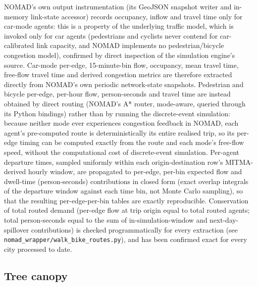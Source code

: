 \documentclass[pdflatex,sn-mathphys-ay]{sn-jnl}
\begin{document}
NOMAD's own output instrumentation (its GeoJSON snapshot writer and
in-memory link-state accessor) records occupancy, inflow and travel time only
for car-mode agents: this is a property of the underlying traffic model, which
is invoked only for car agents (pedestrians and cyclists never contend for
car-calibrated link capacity, and NOMAD implements no pedestrian/bicycle
congestion model), confirmed by direct inspection of the simulation engine's
source. Car-mode per-edge, 15-minute-bin flow, occupancy, mean travel time,
free-flow travel time and derived congestion metrics are therefore extracted
directly from NOMAD's own periodic network-state snapshots. Pedestrian and
bicycle per-edge, per-hour flow, person-seconds and travel time are instead
obtained by direct routing (NOMAD's A* router, mode-aware, queried through
its Python bindings) rather than by running the discrete-event simulation:
because neither mode ever experiences congestion feedback in NOMAD, each
agent's pre-computed route is deterministically its entire realised trip, so
its per-edge timing can be computed exactly from the route and each mode's
free-flow speed, without the computational cost of discrete-event simulation.
Per-agent departure times, sampled uniformly within each origin-destination
row's MITMA-derived hourly window, are propagated to per-edge, per-bin
expected flow and dwell-time (person-seconds) contributions in closed form
(exact overlap integrals of the departure window against each time bin, not
Monte Carlo sampling), so that the resulting per-edge-per-bin tables are
exactly reproducible. Conservation of total routed demand (per-edge flow at
trip origin equal to total routed agents; total person-seconds equal to the
sum of in-simulation-window and next-day-spillover contributions) is checked
programmatically for every extraction (see
\texttt{nomad\_wrapper/walk\_bike\_routes.py}), and has been confirmed exact
for every city processed to date.

\subsection{Tree canopy}
\label{sec:canopy}
\end{document}
